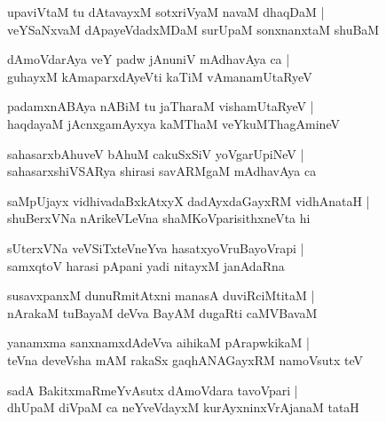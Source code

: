 \documentclass[twoside,12pt,openright]{book}
\newcounter{shloka}[chapter]
\begin{document}
\begin{shloka}%
upaviVtaM tu dAtavayxM sotxriVyaM navaM dhaqDaM |\\
veYSaNxvaM dApayeVdadxMDaM surUpaM sonxnanxtaM shuBaM 
\end{shloka}

\begin{shloka}%
dAmoVdarAya veY padw jAnuniV mAdhavAya ca |\\
guhayxM kAmaparxdAyeVti kaTiM vAmanamUtaRyeV
\end{shloka}

\begin{shloka}%
padamxnABAya nABiM tu jaTharaM vishamUtaRyeV |\\
haqdayaM jAcnxgamAyxya kaMThaM veYkuMThagAmineV 
\end{shloka}

\begin{shloka}%
sahasarxbAhuveV bAhuM cakuSxSiV yoVgarUpiNeV |\\
sahasarxshiVSARya shirasi savARMgaM mAdhavAya ca 
\end{shloka}

\begin{shloka}%
saMpUjayx vidhivadaBxkAtxyX dadAyxdaGayxRM vidhAnataH |\\
shuBerxVNa nArikeVLeVna shaMKoVparisithxneVta hi
\end{shloka}

\begin{shloka}%
sUterxVNa veVSiTxteVneYva hasatxyoVruBayoVrapi |\\
samxqtoV harasi pApani yadi nitayxM janAdaRna
\end{shloka}

\begin{shloka}%
susavxpanxM dunuRmitAtxni manasA duviRciMtitaM |\\
nArakaM tuBayaM deVva BayAM dugaRti caMVBavaM 
\end{shloka}

\begin{shloka}%
yanamxma sanxnamxdAdeVva aihikaM pArapwkikaM |\\
teVna deveVsha mAM rakaSx gaqhANAGayxRM namoVsutx teV 
\end{shloka}

\begin{shloka}%
sadA BakitxmaRmeYvAsutx dAmoVdara tavoVpari |\\
dhUpaM diVpaM ca neYveVdayxM kurAyxninxVrAjanaM tataH 
\end{shloka}
\end{document}
